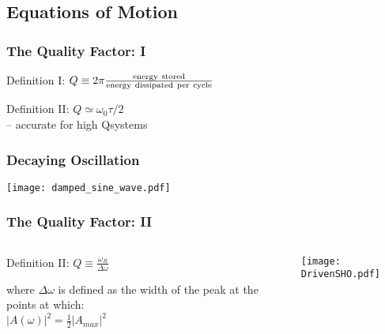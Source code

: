 \documentclass[pdf,hideothersubsections]{beamer}
\begin{document}
\subsection{Equations of Motion}
\begin{frame}
\frametitle{The Quality Factor: I}
\pause
\begin{block}{Definition I:}
$Q \equiv 2 \pi \frac{\rm energy~stored}{\rm energy~dissipated~per~cycle}$
\end{block}
\pause
\begin{block}{Definition II:}
$Q \simeq \omega_0 \tau / 2$ \\
-- accurate for high Q\footnotemark systems
\end{block}


\end{frame}

\begin{frame}
\frametitle{Decaying Oscillation}

\centering
\texttt{[image: damped\_sine\_wave.pdf]}

\end{frame}



\begin{frame}
\frametitle{The Quality Factor: II}

\begin{columns}
\begin{column}{0.4\textwidth}
\pause
\begin{block}{Definition II:}
\centering
$Q \equiv \frac{\omega_R}{\Delta \omega}$
\end{block}
\pause
where $\Delta \omega$ is defined as the width of the peak at the
points at which: \\
\centering
$|A(\omega)|^2 = \frac{1}{2} |A_{max}|^2$

\end{column}

\pause
\begin{column}{0.6\textwidth}
\centering
\texttt{[image: DrivenSHO.pdf]}

\end{column}
\end{columns}
\end{frame}
\end{document}
